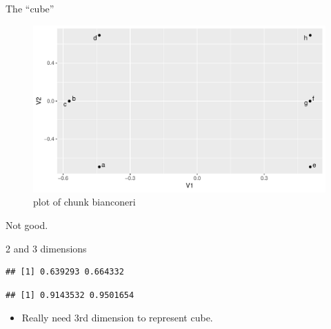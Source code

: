 \documentclass[ignorenonframetext,]{beamer}
\newenvironment{Shaded}{\begin{snugshade}}{\end{snugshade}}
\newcommand{\DataTypeTok}[1]{\textcolor[rgb]{0.13,0.29,0.53}{#1}}
\newcommand{\DecValTok}[1]{\textcolor[rgb]{0.00,0.00,0.81}{#1}}
\newcommand{\FloatTok}[1]{\textcolor[rgb]{0.00,0.00,0.81}{#1}}
\newcommand{\KeywordTok}[1]{\textcolor[rgb]{0.13,0.29,0.53}{\textbf{#1}}}
\newcommand{\NormalTok}[1]{#1}
\newcommand{\OperatorTok}[1]{\textcolor[rgb]{0.81,0.36,0.00}{\textbf{#1}}}
\newcommand{\StringTok}[1]{\textcolor[rgb]{0.31,0.60,0.02}{#1}}
\providecommand{\tightlist}{%
  \setlength{\itemsep}{0pt}\setlength{\parskip}{0pt}}
\begin{document}
\begin{frame}{The ``cube''}
\protect\hypertarget{the-cube}{}

\begin{figure}
\centering
\includegraphics{figure/bianconeri-1.pdf}
\caption{plot of chunk bianconeri}
\end{figure}

Not good.

\end{frame}

\begin{frame}[fragile]{2 and 3 dimensions}
\protect\hypertarget{and-3-dimensions}{}

\begin{Shaded}
\end{Shaded}

\begin{verbatim}
## [1] 0.639293 0.664332
\end{verbatim}

\begin{Shaded}
\end{Shaded}

\begin{verbatim}
## [1] 0.9143532 0.9501654
\end{verbatim}

\begin{itemize}
\tightlist
\item
  Really need 3rd dimension to represent cube.
\end{itemize}

\end{frame}
\end{document}
